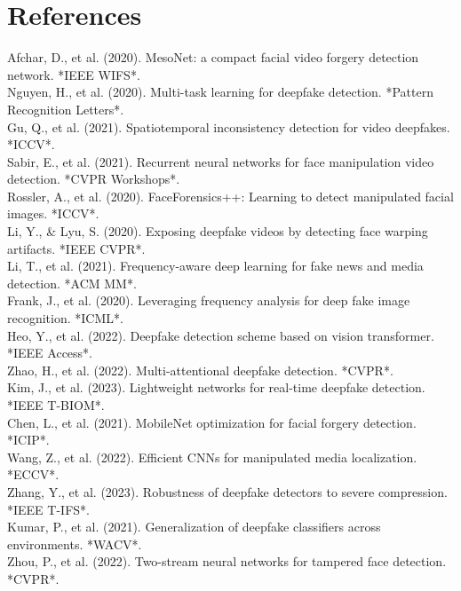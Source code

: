 \documentclass[12pt,a4paper]{article}
\begin{document}
\section{References}
\noindent [1] Afchar, D., et al. (2020). MesoNet: a compact facial video forgery detection network. *IEEE WIFS*.\\[0.5em]
\noindent [2] Nguyen, H., et al. (2020). Multi-task learning for deepfake detection. *Pattern Recognition Letters*.\\[0.5em]
\noindent [3] Gu, Q., et al. (2021). Spatiotemporal inconsistency detection for video deepfakes. *ICCV*.\\[0.5em]
\noindent [4] Sabir, E., et al. (2021). Recurrent neural networks for face manipulation video detection. *CVPR Workshops*.\\[0.5em]
\noindent [5] Rossler, A., et al. (2020). FaceForensics++: Learning to detect manipulated facial images. *ICCV*.\\[0.5em]
\noindent [6] Li, Y., & Lyu, S. (2020). Exposing deepfake videos by detecting face warping artifacts. *IEEE CVPR*.\\[0.5em]
\noindent [7] Li, T., et al. (2021). Frequency-aware deep learning for fake news and media detection. *ACM MM*.\\[0.5em]
\noindent [8] Frank, J., et al. (2020). Leveraging frequency analysis for deep fake image recognition. *ICML*.\\[0.5em]
\noindent [9] Heo, Y., et al. (2022). Deepfake detection scheme based on vision transformer. *IEEE Access*.\\[0.5em]
\noindent [10] Zhao, H., et al. (2022). Multi-attentional deepfake detection. *CVPR*.\\[0.5em]
\noindent [11] Kim, J., et al. (2023). Lightweight networks for real-time deepfake detection. *IEEE T-BIOM*.\\[0.5em]
\noindent [12] Chen, L., et al. (2021). MobileNet optimization for facial forgery detection. *ICIP*.\\[0.5em]
\noindent [13] Wang, Z., et al. (2022). Efficient CNNs for manipulated media localization. *ECCV*.\\[0.5em]
\noindent [14] Zhang, Y., et al. (2023). Robustness of deepfake detectors to severe compression. *IEEE T-IFS*.\\[0.5em]
\noindent [15] Kumar, P., et al. (2021). Generalization of deepfake classifiers across environments. *WACV*.\\[0.5em]
\noindent [16] Zhou, P., et al. (2022). Two-stream neural networks for tampered face detection. *CVPR*.\\[0.5em]
\end{document}
